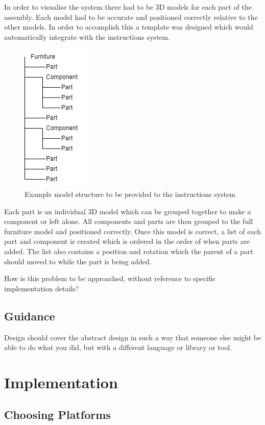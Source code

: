 \documentclass{l4proj}
\begin{document}
In order to visualise the system there had to be 3D models for each part of the assembly. Each model had to be accurate and positioned correctly relative to the other models. In order to accomplish this a template was designed which would automatically integrate with the instructions system. 

\begin{figure}[hbt!]
    \centering
    \includegraphics[width=0.2\linewidth]{dissertation//images/modelFileStructure .jpg}
    \caption{Example model structure to be provided to the instructions system}
    \label{fig:modelStruct}
\end{figure}

Each part is an individual 3D model which can be grouped together to make a component or left alone. All components and parts are then grouped to the full furniture model and positioned correctly. Once this model is correct, a list of each part and component is created which is ordered in the order of when parts are added. The list also contains a position and rotation which the parent of a part should moved to while the part is being added.

How is this problem to be approached, without reference to specific implementation details? 
\section{Guidance}
Design should cover the abstract design in such a way that someone else might be able to do what you did, but with a different language or library or tool.

\chapter{Implementation}

\section{Choosing Platforms}
\end{document}
